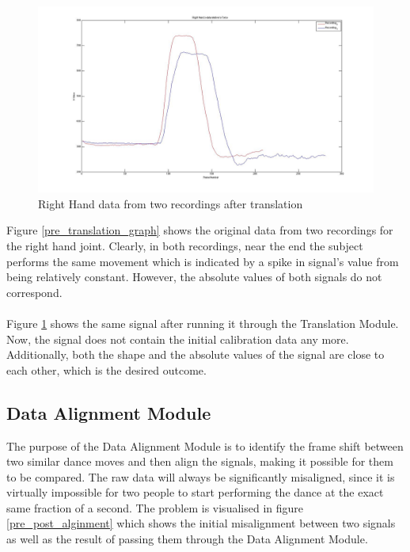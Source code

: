 \documentclass[a4paper]{article}
\begin{document}
\begin{figure}[H]
\centering
\includegraphics[scale=0.3]{R_H_Data_Relative_Torso.jpg}
\caption{Right Hand data from two recordings after translation}
\label{post_translation_graph}
\end{figure}

\noindent
Figure \ref{pre_translation_graph} shows the original data from two recordings for the right hand joint. Clearly, in both recordings, near the end the subject performs the same movement which is indicated by a spike in signal's value from being relatively constant. However, the absolute values of both signals do not correspond.
\\\\
\noindent
Figure \ref{post_translation_graph} shows the same signal after running it through the Translation Module. Now, the signal does not contain the initial calibration data any more. Additionally, both the shape and the absolute values of the signal are close to each other, which is the desired outcome.

\clearpage
\subsection{Data Alignment Module}
\noindent
The purpose of the Data Alignment Module is to identify the frame shift between two similar dance moves and then align the signals, making it possible for them to be compared. The raw data will always be significantly misaligned, since it is virtually impossible for two people to start performing the dance at the exact same fraction of a second. The problem is visualised in figure \ref{pre_post_alginment} which shows the initial misalignment between two signals as well as the result of passing them through the Data Alignment Module.
\end{document}
